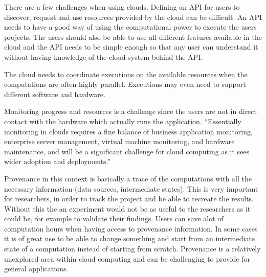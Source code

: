
There are a few challenges when using clouds. Defining an API for
users to discover, request and use resources provided by the cloud can
be difficult. An API needs to have a good way of using the
computational power to execute the users projects. The users should
also be able to use all different features available in the cloud and
the API needs to be simple enough so that any user can understand it
without having knowledge of the cloud system behind the API.

The cloud needs to coordinate executions on the available resources
when the computations are often highly parallel. Executions may even
need to support different software and hardware.



Monitoring progress and resources is a challenge since the users are
not in direct contact with the hardware which actually runs the
application. ``Essentially monitoring in clouds requires a fine
balance of business application monitoring, enterprise server
management, virtual machine monitoring, and hardware maintenance, and
will be a significant challenge for cloud computing as it sees wider
adoption and deployments.''\citep{foster:2008}



Provenance in this context is basically a trace of the computations
with all the necessary information (data sources, intermediate
states). This is very important for researchers, in order to track the
project and be able to recreate the results. Without this the an
experiment would not be as useful to the researchers as it could be,
for example to validate their findings. Users can save alot of
computation hours when having access to provenance information. In
some cases it is of great use to be able to change something and start
from an intermediate state of a computation instead of starting from
scratch. Provenance is a relatively unexplored area within cloud
computing and can be challenging to provide for general applications.

